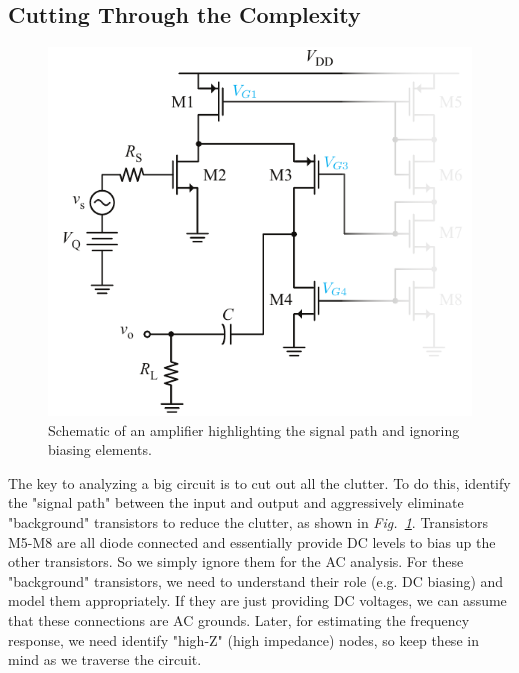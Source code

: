 \subsection{Cutting Through the Complexity}
\begin{figure}[tb]
\centering
\includegraphics[scale=1]{17cascode_folded_declutter}
\caption{Schematic of an amplifier highlighting the signal path and ignoring biasing elements.} \label{fig:17cascode_folded_declutter}
\end{figure}
The key to analyzing a big circuit is to cut out all the clutter.  To do this, identify the "signal path" between the input and output and aggressively eliminate "background" transistors to reduce the clutter, as shown in \emph{Fig.~\ref{fig:17cascode_folded_declutter}}.  Transistors M5-M8 are all diode connected and essentially provide DC levels to bias up the other transistors.  So we simply ignore them for the AC analysis.  For these "background" transistors, we need to understand their role (e.g. DC biasing) and model them appropriately.  If they are just providing DC voltages, we can assume that these connections are AC grounds.  Later, for estimating the frequency response, we need identify "high-Z" (high impedance) nodes, so keep these in mind as we traverse the circuit.
